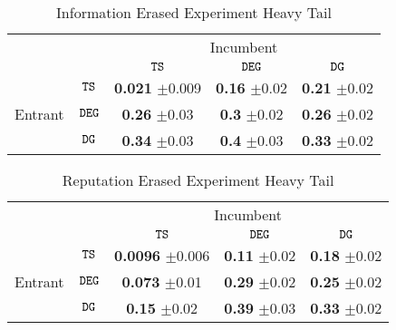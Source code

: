 \documentclass[../competing_bandits.tex]{subfiles}
\begin{document}
\begin{table}[ht]
\centering
\caption{Information Erased Experiment Heavy Tail}
\begin{tabular}{cc|c|c|c|}
  & \multicolumn{1}{c}{} & \multicolumn{3}{c}{Incumbent} \\
  & \multicolumn{1}{c}{} & \multicolumn{1}{c}{$\mathtt{TS}$}  & \multicolumn{1}{c}{$\mathtt{DEG}$}  & \multicolumn{1}{c}{$\mathtt{DG}$} \\\cline{3-5}
            & $\mathtt{TS}$ & \makecell{\textbf{0.021} \\$\pm$0.009}& 		\makecell{\textbf{0.16} \\$\pm$0.02} & 
            \makecell{\textbf{0.21} \\ $\pm$0.02} \\ \cline{3-5}
Entrant  & $\mathtt{DEG}$ & \makecell{\textbf{0.26} \\$\pm$0.03} & \makecell{\textbf{0.3} \\$\pm$0.02} & 
\makecell{\textbf{0.26} \\ $\pm$0.02} \\ \cline{3-5}
            & $\mathtt{DG}$ & \makecell{\textbf{0.34} \\ $\pm$0.03} & \makecell{\textbf{0.4} \\$\pm$0.03} & 
            \makecell{\textbf{0.33} \\$\pm$0.02} \\\cline{3-5}
\end{tabular}
\label{info_erase}
\end{table}

\begin{table}[ht]
\centering
\caption{Reputation Erased Experiment Heavy Tail}
\begin{tabular}{cc|c|c|c|}
  & \multicolumn{1}{c}{} & \multicolumn{3}{c}{Incumbent} \\
  & \multicolumn{1}{c}{} & \multicolumn{1}{c}{$\mathtt{TS}$}  & \multicolumn{1}{c}{$\mathtt{DEG}$}  & \multicolumn{1}{c}{$\mathtt{DG}$} \\\cline{3-5}
            & $\mathtt{TS}$ & \makecell{\textbf{0.0096} \\$\pm$0.006}& 		\makecell{\textbf{0.11} \\$\pm$0.02} & 
            \makecell{\textbf{0.18} \\$\pm$0.02} \\ \cline{3-5}
Entrant  & $\mathtt{DEG}$ & \makecell{\textbf{0.073} \\ $\pm$0.01} & \makecell{\textbf{0.29} \\ $\pm$0.02} & 
\makecell{\textbf{0.25} \\$\pm$0.02} \\ \cline{3-5}
            & $\mathtt{DG}$ &\makecell{\textbf{0.15} \\$\pm$0.02} & \makecell{\textbf{0.39} \\$\pm$0.03} & 
           \makecell{\textbf{0.33} \\ $\pm$0.02} \\\cline{3-5}
\end{tabular}
\label{rep_erase}
\end{table}
\end{document}

